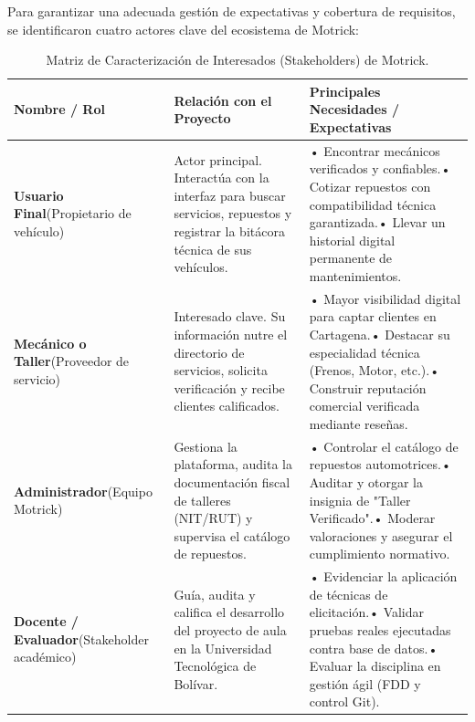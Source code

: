 \documentclass[11pt,letterpaper]{article}
\begin{document}
Para garantizar una adecuada gestión de expectativas y cobertura de requisitos, se identificaron cuatro actores clave del ecosistema de Motrick:

\begin{table}[h!]
\centering
\small
\begin{tabularx}{\textwidth}{p{3.2cm}Xp{6.5cm}}
\toprule
\textbf{Nombre / Rol} & \textbf{Relación con el Proyecto} & \textbf{Principales Necesidades / Expectativas} \\
\midrule
\textbf{Usuario Final}\newline (Propietario de vehículo) & Actor principal. Interactúa con la interfaz para buscar servicios, repuestos y registrar la bitácora técnica de sus vehículos. & • Encontrar mecánicos verificados y confiables.\newline • Cotizar repuestos con compatibilidad técnica garantizada.\newline • Llevar un historial digital permanente de mantenimientos. \\
\addlinespace
\textbf{Mecánico o Taller}\newline (Proveedor de servicio) & Interesado clave. Su información nutre el directorio de servicios, solicita verificación y recibe clientes calificados. & • Mayor visibilidad digital para captar clientes en Cartagena.\newline • Destacar su especialidad técnica (Frenos, Motor, etc.).\newline • Construir reputación comercial verificada mediante reseñas. \\
\addlinespace
\textbf{Administrador}\newline (Equipo Motrick) & Gestiona la plataforma, audita la documentación fiscal de talleres (NIT/RUT) y supervisa el catálogo de repuestos. & • Controlar el catálogo de repuestos automotrices.\newline • Auditar y otorgar la insignia de "Taller Verificado".\newline • Moderar valoraciones y asegurar el cumplimiento normativo. \\
\addlinespace
\textbf{Docente / Evaluador}\newline (Stakeholder académico) & Guía, audita y califica el desarrollo del proyecto de aula en la Universidad Tecnológica de Bolívar. & • Evidenciar la aplicación de técnicas de elicitación.\newline • Validar pruebas reales ejecutadas contra base de datos.\newline • Evaluar la disciplina en gestión ágil (FDD y control Git). \\
\bottomrule
\end{tabularx}
\caption{Matriz de Caracterización de Interesados (Stakeholders) de Motrick.}
\end{table}
\end{document}
